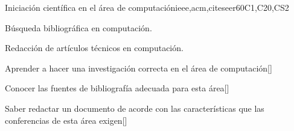 \begin{syllabus}
\begin{outcomes}
  \item {}
  \item {}
  \item {}
  \item {}
  \item {}
  \item {}
  \item {}
  \item {}
\end{outcomes}
\begin{competences}
    \item {} 
    \item {}
    \item {}
\end{competences}

\begin{unit}{}{Iniciación científica en el área de computación}{ieee,acm,citeseer}{60}{C1,C20,CS2}
  \begin{topics}
      \item Búsqueda bibliográfica en computación.
      \item Redacción de artículos técnicos en computación.
  \end{topics}
  \begin{learningoutcomes}
      \item Aprender a hacer una investigación correcta en el área de computación[\Usage]
      \item Conocer las fuentes de bibliografía adecuada para esta área[\Usage]
      \item Saber redactar un documento de acorde con las características que las conferencias de esta área exigen[\Usage]
  \end{learningoutcomes}
\end{unit}



\begin{coursebibliography}
\end{coursebibliography}

\end{syllabus}
